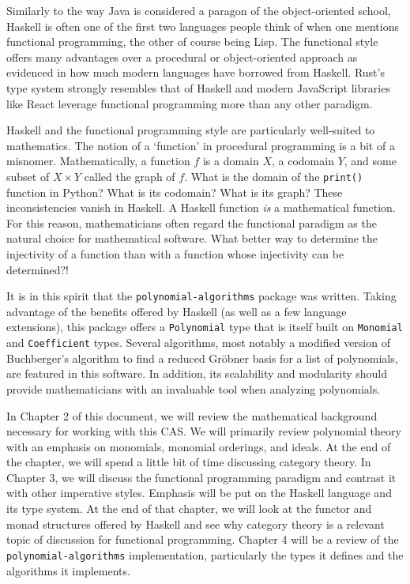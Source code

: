 \documentclass[MS, xcolor=dvipsnames]{wfuthesis}
\theoremstyle{definition}
\begin{document}
Similarly to the way Java is considered a paragon of the object-oriented school, Haskell is often one of the first two languages people think of when one mentions functional programming, the other of course being Lisp. The functional style offers many advantages over a procedural or object-oriented approach as evidenced in how much modern languages have borrowed from Haskell. Rust's type system strongly resembles that of Haskell \cite{Poss2014} and modern JavaScript libraries like React  leverage functional programming more than any other paradigm. \par 
Haskell and the functional programming style are particularly well-suited to mathematics. The notion of a `function' in procedural programming is a bit of a misnomer. Mathematically, a function $f$ is a domain $X$, a codomain $Y$, and some subset of $X \times Y$ called the graph of $f$. What is the domain of the \lstinline{print()} function in Python? What is its codomain? What is its graph? These inconsistencies vanish in Haskell. A Haskell function \textit{is} a mathematical function. For this reason, mathematicians often regard the functional paradigm as the natural choice for mathematical software. What better way to determine the injectivity of a function than with a function whose injectivity can be determined?! \par 
It is in this spirit that the \lstinline{polynomial-algorithms} package was written. Taking advantage of the benefits offered by Haskell (as well as a few language extensions), this package offers a \lstinline{Polynomial} type that is itself built on \lstinline{Monomial} and \lstinline{Coefficient} types. Several algorithms, most notably a modified version of Buchberger's algorithm to find a reduced Gr\"obner basis for a list of polynomials, are featured in this software. In addition, its scalability and modularity should provide mathematicians with an invaluable tool when analyzing polynomials. \par 
In Chapter 2 of this document, we will review the mathematical background necessary for working with this CAS. We will primarily review polynomial theory with an emphasis on monomials, monomial orderings, and ideals. At the end of the chapter, we will spend a little bit of time discussing category theory. In Chapter 3, we will discuss the functional programming paradigm and contrast it with other imperative styles. Emphasis will be put on the Haskell language and its type system. At the end of that chapter, we will look at the functor and monad structures offered by Haskell and see why category theory is a relevant topic of discussion for functional programming. Chapter 4 will be a review of the \lstinline{polynomial-algorithms} implementation, particularly the types it defines and the algorithms it implements. 
\end{document}
